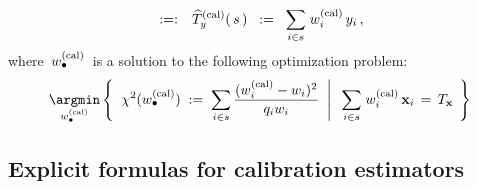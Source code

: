 \begin{definition}
\begin{eqnarray*}
& :=: &
\widehat{T}_{y}^{\textnormal{(cal)}}(\,s\,)
\;\; := \;\;
    \underset{i \in s}{\sum}\;
    w^{\textnormal{(cal)}}_{i}\,y_{i}\,,
\end{eqnarray*}
where
\,$w^{\textnormal{(cal)}}_{\bullet}$\,
is a solution to the following optimization problem:
\begin{equation*}
\underset{w^{\textnormal{(cal)}}_{\bullet}}{\argmin}
\left\{\;\,
    \left.
    \chi^{2}(w^{\textnormal{(cal)}}_{\bullet})
    \;:=\;
        \underset{i \in s}{\sum}\,
        \dfrac{(w^{\textnormal{(cal)}}_{i}-w_{i})^{2}}{q_{i}w_{i}}
    \;\;\right\vert\;\;
        \underset{i \in s}{\sum}\;
        w^{\textnormal{(cal)}}_{i}\,\mathbf{x}_{i}
        \,=\,
        T_{\mathbf{x}}
    \;\,\right\}
\end{equation*}
\end{definition}


\vskip 0.5cm
\subsection{Explicit formulas for calibration estimators}


